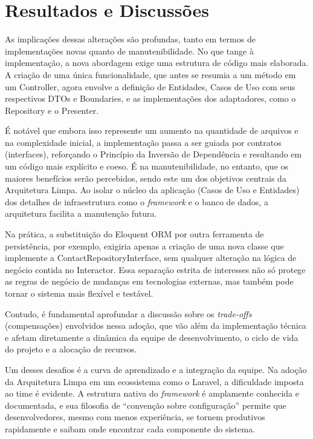 \chapter{Resultados e Discussões}
\thispagestyle{headings}

    \par As implicações dessas alterações são profundas, tanto em termos de implementações novas quanto de manutenibilidade. No que tange à implementação, a nova abordagem exige uma estrutura de código mais elaborada. A criação de uma única funcionalidade, que antes se resumia a um método em um Controller, agora envolve a definição de Entidades, Casos de Uso com seus respectivos DTOs e Boundaries, e as implementações dos adaptadores, como o Repository e o Presenter.
    
    \par É notável que embora isso represente um aumento na quantidade de arquivos e na complexidade inicial, a implementação passa a ser guiada por contratos (interfaces), reforçando o Princípio da Inversão de Dependência e resultando em um código mais explícito e coeso. É na manutenibilidade, no entanto, que os maiores benefícios serão percebidos, sendo este um dos objetivos centrais da Arquitetura Limpa. Ao isolar o núcleo da aplicação (Casos de Uso e Entidades) dos detalhes de infraestrutura como o \textit{framework} e o banco de dados, a arquitetura facilita a manutenção futura. 
    
    \par Na prática, a substituição do Eloquent ORM por outra ferramenta de persistência, por exemplo, exigiria apenas a criação de uma nova classe que implemente a ContactRepositoryInterface, sem qualquer alteração na lógica de negócio contida no Interactor. Essa separação estrita de interesses não só protege as regras de negócio de mudanças em tecnologias externas, mas também pode tornar o sistema mais flexível e testável.
    
    \par Contudo, é fundamental aprofundar a discussão sobre os \textit{trade-offs} (compensações) envolvidos nessa adoção, que vão além da implementação técnica e afetam diretamente a dinâmica da equipe de desenvolvimento, o ciclo de vida do projeto e a alocação de recursos.
    
    \par Um desses desafios é a curva de aprendizado e a integração da equipe. Na adoção da Arquitetura Limpa em um ecossistema como o Laravel, a dificuldade imposta ao time é evidente. A estrutura nativa do \textit{framework} é amplamente conhecida e documentada, e sua filosofia de ``convenção sobre configuração'' permite que desenvolvedores, mesmo com menos experiência, se tornem produtivos rapidamente e saibam onde encontrar cada componente do sistema. 
    
